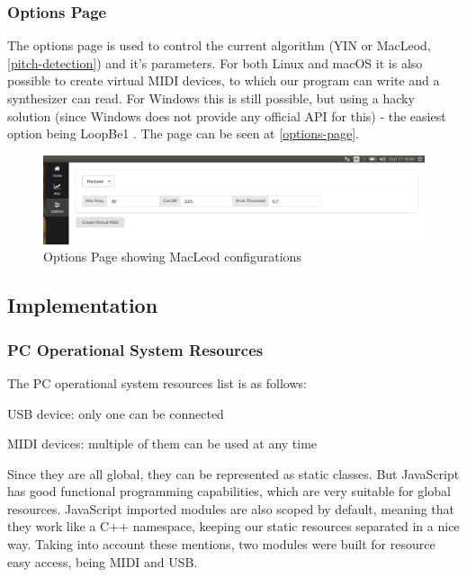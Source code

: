 \subsubsection{Options Page}
The options page is used to control the current algorithm (YIN or MacLeod, \autoref{pitch-detection})
and it's parameters. For both Linux and macOS it is also possible to create virtual
MIDI devices, to which our program can write and a synthesizer can read. For Windows
this is still possible, but using a hacky solution (since Windows does not provide any
official API for this) - the easiest option being LoopBe1 \cite{LoopBe1}. The
page can be seen at \autoref{options-page}.
\begin{figure}[htb]
	\caption{Options Page showing MacLeod configurations}
	\label{options-page}
	\begin{center}
		\includegraphics[width=0.7\paperwidth]{images/snapshots/options}
	\end{center}
\end{figure}

\subsection{Implementation}

\subsubsection{PC Operational System Resources}
The PC operational system resources list is as follows:
\begin{itemlist}
	\item USB device: only one can be connected
	\item MIDI devices: multiple of them can be used at any time
\end{itemlist}

Since they are all global, they can be represented as static classes.
But JavaScript has good functional programming capabilities, which are very
suitable for global resources. JavaScript imported modules are also scoped by default,
meaning that they work like a C++ namespace, keeping our static resources separated in
a nice way. Taking into account these mentions, two modules were built for resource
easy access, being MIDI and USB.

